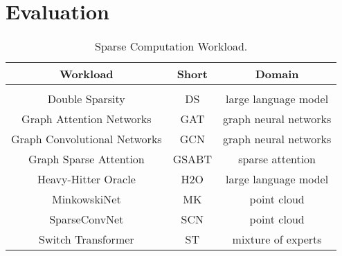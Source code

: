 \section{Evaluation}

\begin{table}[t]
    \centering
    \caption{Sparse Computation Workload.}
    \vspace{-5pt}
    \begin{tabular}{|c|c|c|}
    \hline  
        Workload & Short & Domain  \\
        \hline
        \multicolumn{3}{c}{\vspace{-7pt}} \\
        \hline
        Double Sparsity\cite{21doublesparsity}               & DS     & large language model            \\\hline
        Graph Attention Networks\cite{22GAT}      & GAT    & graph neural networks           \\\hline
        Graph Convolutional Networks\cite{23GCN}  & GCN    & graph neural networks           \\\hline
        Graph Sparse Attention \cite{24GSABT}            & GSABT  & sparse attention                \\\hline
        Heavy-Hitter Oracle\cite{25h2o}           & H2O    & large language model            \\\hline
        MinkowskiNet\cite{26MK}                & MK     & point cloud                     \\\hline
        SparseConvNet \cite{27SCN}                        & SCN    & point cloud                     \\\hline
        Switch Transformer\cite{28ST}             & ST     & mixture of experts              \\\hline
    \end{tabular}
    \vspace{-15pt}
    \label{tab:tab1}
\end{table}








